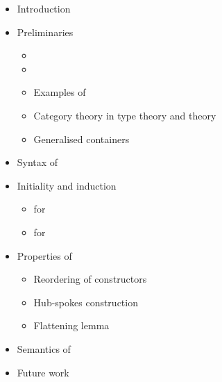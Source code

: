 \documentclass[a4paper,10pt]{report}
\begin{document}
\begin{itemize}
\item Introduction
\item Preliminaries
  \begin{itemize}
  \item \mltt
  \item \Hott
  \item Examples of \hits
  \item Category theory in type theory and \omegacat theory
  \item Generalised containers
  \end{itemize}
\item Syntax of \hits
\item Initiality and induction
  \begin{itemize}
  \item for \oits
  \item for \hits
  \end{itemize}
\item Properties of \hits
  \begin{itemize}
  \item Reordering of constructors
  \item Hub-spokes construction
  \item Flattening lemma
  \end{itemize}
\item Semantics of \hits
\item Future work
\end{itemize}

\newpage

\listoftodos
\todototoc


\end{document}
